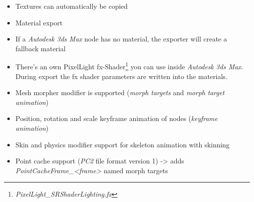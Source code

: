 \begin{itemize}
\item{Textures can automatically be copied}
\item{Material export}
\item{If a \emph{Autodesk 3ds Max} node has no material, the exporter will create a fallback material}
\item{There's an own PixelLight fx-Shader\footnote{\emph{PixelLight\_SRShaderLighting.fx}} you can use inside \emph{Autodesk 3ds Max}. During export the fx shader parameters are written into the materials.}
\item{Mesh morpher modifier is supported (\emph{morph targets} and \emph{morph target animation})}
\item{Position, rotation and scale keyframe animation of nodes (\emph{keyframe animation})}
\item{Skin and physics modifier support for skeleton animation with skinning}
\item{Point cache support (\emph{PC2} file format version 1) -> adds \emph{PointCacheFrame\_<frame>} named morph targets}
\end{itemize}
